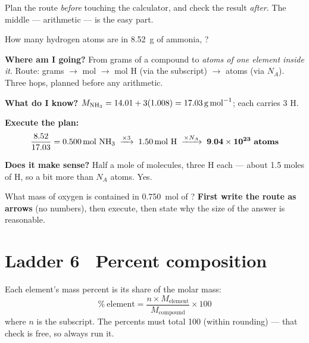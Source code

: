 \documentclass{apchem-worksheet}
\begin{document}
Plan the route \emph{before} touching the calculator, and check the
result \emph{after}. The middle --- arithmetic --- is the easy part.

\begin{workedexample}
How many hydrogen atoms are in \SI{8.52}{\gram} of ammonia, ?

\textbf{Where am I going?} From grams of a compound to \emph{atoms of one
element inside it}. Route: grams $\to$ mol  $\to$ mol H (via the
subscript) $\to$ atoms (via $N_A$). Three hops, planned before any
arithmetic.

\textbf{What do I know?} $M_{\ce{NH3}} = 14.01 + 3(1.008) =
\SI{17.03}{\gram\per\mole}$; each  carries 3 H.

\textbf{Execute the plan:}
\[ \frac{8.52}{17.03} = \SI{0.500}{\mole}~\ce{NH3}
   \;\xrightarrow{\times 3}\; \SI{1.50}{\mole}~\ce{H}
   \;\xrightarrow{\times N_A}\; \mathbf{9.04\times10^{23}~atoms} \]

\textbf{Does it make sense?} Half a mole of molecules, three H each ---
about 1.5 moles of H, so a bit more than $N_A$ atoms. Yes.
\end{workedexample}

\begin{yourturn}
What mass of oxygen is contained in \SI{0.750}{\mole} of ?
\textbf{First write the route as arrows} (no numbers), then execute, then
state why the size of the answer is reasonable. \workspace[3.2cm]
\end{yourturn}

\section*{\sffamily Ladder 6 \textbullet\ Percent composition}

Each element's mass percent is its share of the molar mass:
\[ \%~\text{element} =
   \frac{n \times M_{\text{element}}}{M_{\text{compound}}} \times 100 \]
where $n$ is the subscript. The percents must total 100 (within
rounding) --- that check is free, so always run it.
\end{document}
